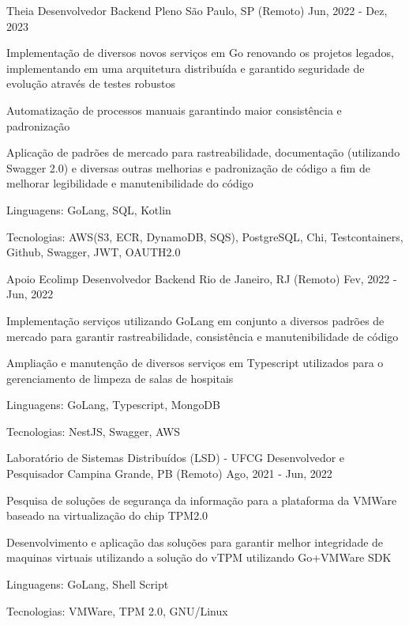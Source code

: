 
\begin{cventries}
  \cventry
  {Theia} %
  {Desenvolvedor Backend Pleno} %
  {São Paulo, SP (Remoto)} %
  {Jun, 2022 - Dez, 2023} %
  {
    \begin{cvitems} %
      \item {Implementação de diversos novos serviços em Go renovando os projetos legados, implementando em uma arquitetura distribuída e garantido seguridade de evolução através de testes robustos}
      \item {Automatização de processos manuais garantindo maior consistência e padronização}
      \item {Aplicação de padrões de mercado para rastreabilidade, documentação (utilizando Swagger 2.0) e diversas outras melhorias e padronização de código a fim de melhorar legibilidade e manutenibilidade do código}
      \item {Linguagens: GoLang, SQL, Kotlin}
      \item {Tecnologias: AWS(S3, ECR, DynamoDB, SQS), PostgreSQL, Chi, Testcontainers, Github, Swagger, JWT, OAUTH2.0}
    \end{cvitems}
  }

  \cventry
  {Apoio Ecolimp} %
  {Desenvolvedor Backend} %
  {Rio de Janeiro, RJ (Remoto)} %
  {Fev, 2022 - Jun, 2022} %
  {
    \begin{cvitems} %
      \item {Implementação serviços utilizando GoLang em conjunto a diversos padrões de mercado para garantir rastreabilidade, consistência e manutenibilidade de código}
      \item {Ampliação e manutenção de diversos serviços em Typescript utilizados para o gerenciamento de limpeza de salas de hospitais}
      \item {Linguagens: GoLang, Typescript, MongoDB}
      \item {Tecnologias: NestJS, Swagger, AWS}
    \end{cvitems}
  }

  \cventry
  {Laboratório de Sistemas Distribuídos (LSD) - UFCG} %
  {Desenvolvedor e Pesquisador} %
  {Campina Grande, PB (Remoto)} %
  {Ago, 2021 - Jun, 2022} %
  {
    \begin{cvitems} %
      \item {Pesquisa de soluções de segurança da informação para a plataforma da VMWare baseado na virtualização do chip TPM2.0}
      \item {Desenvolvimento e aplicação das soluções para garantir melhor integridade de maquinas virtuais utilizando a solução do vTPM utilizando Go+VMWare SDK}
      \item {Linguagens: GoLang, Shell Script}
      \item {Tecnologias: VMWare, TPM 2.0, GNU/Linux}
    \end{cvitems}
  }


\end{cventries}
